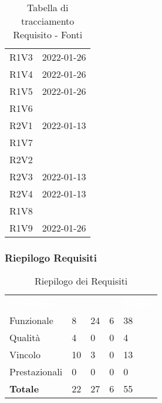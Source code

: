 \begin{table}[!htbp]
\begin{tabular}{ m{}<{\centering}  m{}<{\centering} }
	R1V3 & \Ve{} 2022-01-26 \\	

	R1V4 & \Ve{} 2022-01-26 \\	
	 
	R1V5 & \Ve{} 2022-01-26 \\	
	 
	R1V6 & \Ca \\	
	 
	R2V1 & \Vi{} 2022-01-13 \\
	
	R1V7 & \Ca \\	
	 
	R2V2 & \Ca \\	 

	R2V3 & \Vi{} 2022-01-13 \\	
	 
	R2V4 & \Vi{} 2022-01-13 \\	
	 
	R1V8 & \Ca \\	
	 
	R1V9 & \Ve{} 2022-01-26 \\	

\end{tabular}
\caption{Tabella di tracciamento Requisito - Fonti}
\end{table}

\subsubsection{Riepilogo Requisiti}

\begin{table}[!htbp]
\renewcommand{\arraystretch}{1.5}
\begin{tabular}{ m{}<{\centering}  m{}<{\centering}  m{}<{\centering}  m{}<{\centering}  m{}<{\centering} }
	\rowcolor{darkblue}
	\textcolor{white}{\textbf{Tipologia}} &\textcolor{white}{\textbf{\Ob}}& \textcolor{white}{\textbf{\De}} & \textcolor{white}{\textbf{\Fa}}&\textcolor{white}{\textbf{Totale}}\\ 
	Funzionale & 8 & 24 & 6 & 38\\	
	Qualità & 4 & 0 & 0 & 4 \\	
	Vincolo & 10 & 3 & 0 & 13 \\	
	Prestazionali & 0 & 0 & 0 & 0\\
	\textbf{Totale} & 22 & 	27 & 6 & 55
\end{tabular}
\caption{Riepilogo dei Requisiti}
\end{table}